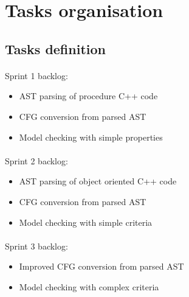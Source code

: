 \documentclass{report}
\begin{document}
\section{Tasks organisation}

\subsection{Tasks definition}

\paragraph{}
\hspace{4mm}\textnormal{Sprint 1 backlog:}

\vspace{4mm}
\begin{itemize}
\item AST parsing of procedure C++ code\vspace{1mm}
\item CFG conversion from parsed AST\vspace{1mm}
\item Model checking with simple properties\vspace{1mm}
\end{itemize}

\paragraph{}
\hspace{4mm}\textnormal{Sprint 2 backlog:}

\vspace{4mm}
\begin{itemize}
\item AST parsing of object oriented C++ code\vspace{1mm}
\item CFG conversion from parsed AST\vspace{1mm}
\item Model checking with simple criteria\vspace{1mm}
\end{itemize}

\paragraph{}
\hspace{4mm}\textnormal{Sprint 3 backlog:}

\vspace{4mm}
\begin{itemize}
\item Improved CFG conversion from parsed AST\vspace{1mm}
\item Model checking with complex criteria\vspace{1mm}
\end{itemize}
\end{document}

